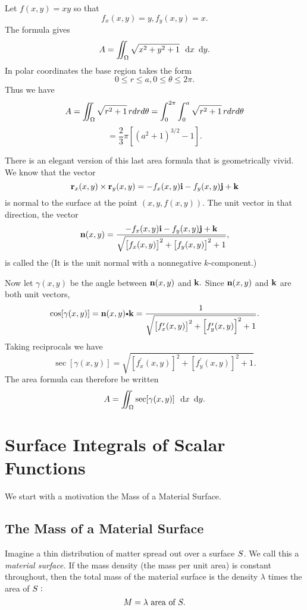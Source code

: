 \begin{solu}
Let $f(x,y)=xy$ so that
\[
f_x(x,y)=y,f_y(x,y)=x.
\]
The formula gives
\[
A=\diint_\Omega \sqrt{x^2+y^2+1}\,\dx\dy.
\]
In polar coordinates the base region takes the form
\[
0\le r\leq a,0\le \theta \le 2\pi .
\]
Thus we have
\[
A=\diint_\Omega \sqrt{r^2+1}\,rdrd\theta =\dint_0^{2\pi }\dint_0^a\sqrt{r^2+1}%
\,rdrd\theta
\]
\[
=\dfrac 23\pi [(a^2+1)^{3/2}-1].
\]

There is an elegant version of this last area formula that is geometrically
vivid. We know that the vector
\[
\mathbf{ r}_x(x,y)\times \mathbf{ r}_y(x,y)=-f_x(x,y)\mathbf{ i}-f_y(x,y)\mathbf{ j}+\mathbf{ k}
\]
is normal to the surface at the point $(x,y,f(x,y)).$ The unit vector in
that direction, the vector
\[
\mathbf{ n}(x,y)=\dfrac{-f_x(x,y)\mathbf{ i}-f_y(x,y)\mathbf{ j}+\mathbf{ k}}{\sqrt{\left[
f_x(x,y)\right] ^2+\left[ f_y(x,y)\right] ^2+1}},
\]
is called the  (It is the unit normal with a
nonnegative $k$-component.)

Now let $\gamma (x,y)$ be the angle between $\mathbf{ n}(x,y)$ and $\mathbf{ k}.$ Since $\mathbf{ n}(x,y)$
and $\mathbf{ k}$ are both unit vectors,
\[
\cos [\gamma (x,y)]=\vector{n}(x,y)\bp \vector{k}=\dfrac 1{\sqrt{\left[ f_x^{\prime }(x,y)%
\right] ^2+\left[ f_y^{\prime }(x,y)\right] ^2+1}}.
\]
Taking reciprocals we have
\[
\sec [\gamma (x,y)]=\sqrt{\left[ f_x^{\prime }(x,y)\right] ^2+\left[
f_y^{\prime }(x,y)\right] ^2+1}.
\]
The area formula can therefore be written
\[
A=\diint_\Omega \sec [\gamma (x,y)]\,\dx\dy.
\]


\end{solu}





\section{Surface Integrals of Scalar Functions}

We start with a motivation the Mass of a Material Surface.
\subsection{The Mass of a Material Surface}

Imagine a thin distribution of matter spread out over a surface $S$. We call
this a {\em material surface.}
If the mass density (the mass per unit area) is constant throughout, then
the total mass of the material surface is the density $\lambda $ times the
area of $S:$
\[M=\lambda \text{ area of }S.\]

